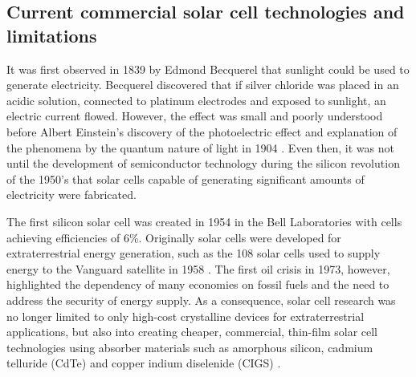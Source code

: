 \documentclass[11pt, twoside]{report}
\begin{document}


\subsection{Current commercial solar cell technologies and limitations}\label{current_tech}
It was first observed in 1839 by Edmond Becquerel that sunlight could be used to generate electricity. Becquerel discovered that if  silver chloride was placed in an acidic solution, connected to platinum electrodes and exposed to sunlight, an electric current flowed. However, the effect was small and poorly understood before Albert Einstein's discovery of the photoelectric effect and explanation of the phenomena by the quantum nature of light in 1904 \cite{PV_history1}. Even then, it was not until the development of semiconductor technology during the silicon revolution of the 1950's that solar cells capable of generating significant amounts of electricity were fabricated.

The first silicon solar cell was created in 1954 in the Bell Laboratories with cells achieving efficiencies of 6\%. 
Originally solar cells were developed for extraterrestrial energy generation, such as the 108 solar cells used to supply energy to the Vanguard satellite in 1958 \cite{PV_history1}. The first oil crisis in 1973, however, highlighted the dependency of many economies on fossil fuels and the need to address the security of energy supply. 
As a consequence, solar cell research was no longer limited to only high-cost crystalline devices for extraterrestrial applications, but also into creating cheaper, commercial, thin-film solar cell technologies using absorber materials such as amorphous silicon, cadmium telluride (CdTe) and copper indium diselenide (CIGS) \cite{PV_history2}.
\end{document}
